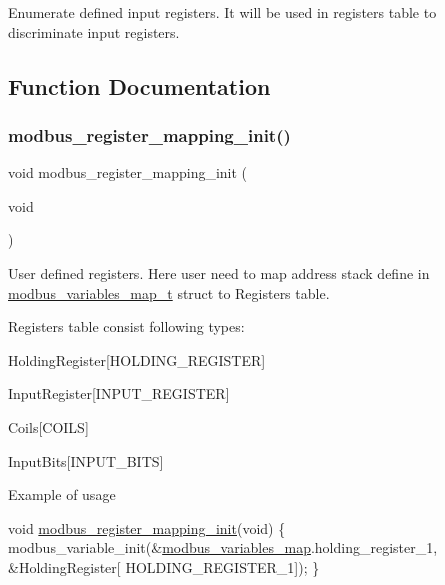 Enumerate defined input registers. It will be used in registers table to discriminate input registers. 



\subsection{Function Documentation}
\mbox{\label{group___insert_ga6dbaaf108ca00d5dfd1037aadfc10f6f}} 
\subsubsection{\texorpdfstring{modbus\+\_\+register\+\_\+mapping\+\_\+init()}{modbus\_register\_mapping\_init()}}
{\footnotesize\ttfamily void modbus\+\_\+register\+\_\+mapping\+\_\+init (\begin{DoxyParamCaption}\item[{void}]{ }\end{DoxyParamCaption})}



User defined registers. Here user need to map address stack define in \mbox{\hyperlink{structmodbus__variables__map__t}{modbus\+\_\+variables\+\_\+map\+\_\+t}} struct to Registers table. 

Registers table consist following types\+:
\begin{DoxyItemize}
\item Holding\+Register\mbox{[}H\+O\+L\+D\+I\+N\+G\+\_\+\+R\+E\+G\+I\+S\+T\+ER\mbox{]}
\item Input\+Register\mbox{[}I\+N\+P\+U\+T\+\_\+\+R\+E\+G\+I\+S\+T\+ER\mbox{]}
\item Coils\mbox{[}C\+O\+I\+LS\mbox{]}
\item Input\+Bits\mbox{[}I\+N\+P\+U\+T\+\_\+\+B\+I\+TS\mbox{]}
\end{DoxyItemize}

Example of usage 
\begin{DoxyCode}
\textcolor{keywordtype}{void} \mbox{\hyperlink{group___insert_ga6dbaaf108ca00d5dfd1037aadfc10f6f}{modbus\_register\_mapping\_init}}(\textcolor{keywordtype}{void})
\{
    modbus\_variable\_init(&\mbox{\hyperlink{group___insert_gac4b2611d22ec97dbb04b0df3b535bd7b}{modbus\_variables\_map}}.holding\_register\_1, &HoldingRegister[
      HOLDING\_REGISTER\_1]);
\}
\end{DoxyCode}


